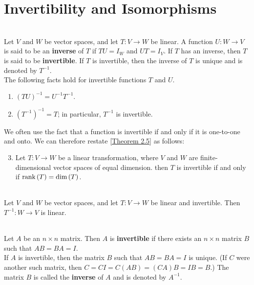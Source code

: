 \section{Invertibility and Isomorphisms}

\begin{definition}
	\hfill\\
	Let $V$ and $W$ be vector spaces, and let $T: V \to W$ be linear. A function $U: W \to V$ is said to be an \textbf{inverse} of $T$ if $TU = I_W$ and $UT = I_V$. If $T$ has an inverse, then $T$ is said to be \textbf{invertible}. If $T$ is invertible, then the inverse of $T$ is unique and is denoted by $T^{-1}$.\\

	The following facts hold for invertible functions $T$ and $U$.

	\begin{enumerate}
		\item $(TU)^{-1} = U^{-1}T^{-1}$.
		\item $(T^{-1})^{-1} = T$; in particular, $T^{-1}$ is invertible.
	\end{enumerate}

	We often use the fact that a function is invertible if and only if it is one-to-one and onto. We can therefore restate \autoref{Theorem 2.5} as follows:

	\begin{enumerate}
		\setcounter{enumi}{2}
		\item Let $T: V \to W$ be a linear transformation, where $V$ and $W$ are finite-dimensional vector spaces of equal dimension. then $T$ is invertible if and only if $\text{rank}\left(T\right) = \text{dim}\left(T\right)$.
	\end{enumerate}
\end{definition}

\begin{theorem}
	\hfill\\
	Let $V$ and $W$ be vector spaces, and let $T: V \to W$ be linear and invertible. Then $T^{-1}: W \to V$ is linear.
\end{theorem}

\begin{definition}
	\hfill\\
	Let $A$ be an $n \times n$ matrix. Then $A$ is \textbf{invertible} if there exists an $n \times n$ matrix $B$ such that $AB = BA = I$.\\

	If $A$ is invertible, then the matrix $B$ such that $AB = BA = I$ is unique. (If $C$ were another such matrix, then $C = CI = C(AB) = (CA)B = IB = B$.) The matrix $B$ is called the \textbf{inverse} of $A$ and is denoted by $A^{-1}$.
\end{definition}

